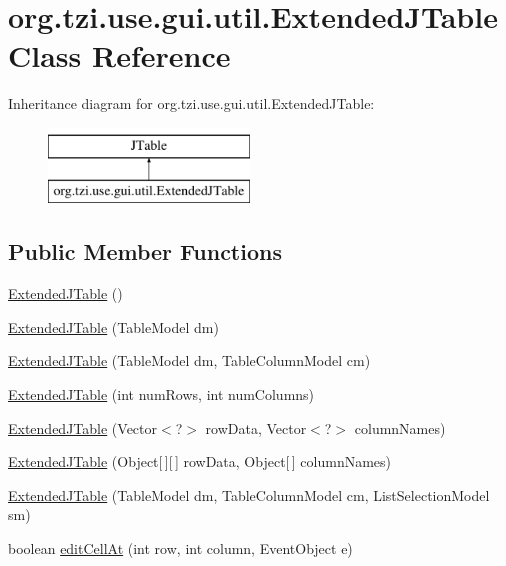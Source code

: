\hypertarget{classorg_1_1tzi_1_1use_1_1gui_1_1util_1_1_extended_j_table}{\section{org.\-tzi.\-use.\-gui.\-util.\-Extended\-J\-Table Class Reference}
\label{classorg_1_1tzi_1_1use_1_1gui_1_1util_1_1_extended_j_table}
}
Inheritance diagram for org.\-tzi.\-use.\-gui.\-util.\-Extended\-J\-Table\-:\begin{figure}[H]
\begin{center}
\leavevmode
\includegraphics[height=2.000000cm]{classorg_1_1tzi_1_1use_1_1gui_1_1util_1_1_extended_j_table}
\end{center}
\end{figure}
\subsection*{Public Member Functions}
\begin{DoxyCompactItemize}
\item 
\hyperlink{classorg_1_1tzi_1_1use_1_1gui_1_1util_1_1_extended_j_table_a6f7966e897efd42daf15b07509740475}{Extended\-J\-Table} ()
\item 
\hyperlink{classorg_1_1tzi_1_1use_1_1gui_1_1util_1_1_extended_j_table_a15d4667070fc2962f773ae851e60afc1}{Extended\-J\-Table} (Table\-Model dm)
\item 
\hyperlink{classorg_1_1tzi_1_1use_1_1gui_1_1util_1_1_extended_j_table_a8fc984ab4b23ba6ed548c37e2e630279}{Extended\-J\-Table} (Table\-Model dm, Table\-Column\-Model cm)
\item 
\hyperlink{classorg_1_1tzi_1_1use_1_1gui_1_1util_1_1_extended_j_table_a0161e0703fd457f540aaab324b0cdb19}{Extended\-J\-Table} (int num\-Rows, int num\-Columns)
\item 
\hyperlink{classorg_1_1tzi_1_1use_1_1gui_1_1util_1_1_extended_j_table_a1fec71d4d4d8c7a7c35e22fb6d67f10c}{Extended\-J\-Table} (Vector$<$?$>$ row\-Data, Vector$<$?$>$ column\-Names)
\item 
\hyperlink{classorg_1_1tzi_1_1use_1_1gui_1_1util_1_1_extended_j_table_a6a44fc75885d038ce9ea42defa1d7327}{Extended\-J\-Table} (Object\mbox{[}$\,$\mbox{]}\mbox{[}$\,$\mbox{]} row\-Data, Object\mbox{[}$\,$\mbox{]} column\-Names)
\item 
\hyperlink{classorg_1_1tzi_1_1use_1_1gui_1_1util_1_1_extended_j_table_a43a1d5aab460c008063fcd5969190b20}{Extended\-J\-Table} (Table\-Model dm, Table\-Column\-Model cm, List\-Selection\-Model sm)
\item 
boolean \hyperlink{classorg_1_1tzi_1_1use_1_1gui_1_1util_1_1_extended_j_table_a2f86e1e3effdd922c18814ecae35bbc7}{edit\-Cell\-At} (int row, int column, Event\-Object e)
\end{DoxyCompactItemize}


